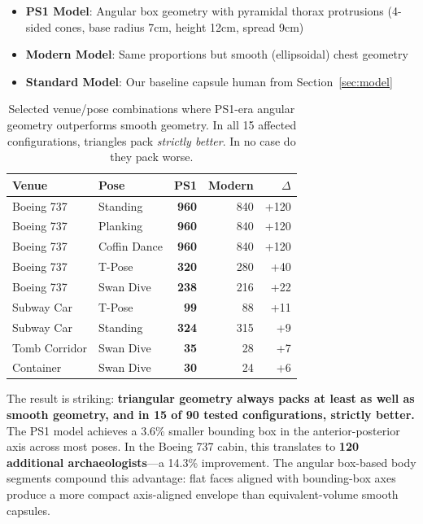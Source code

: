 \documentclass[11pt,letterpaper]{article}
\begin{document}
\begin{itemize}
    \item \textbf{PS1 Model}: Angular box geometry with pyramidal thorax protrusions (4-sided cones, base radius 7cm, height 12cm, spread 9cm)
    \item \textbf{Modern Model}: Same proportions but smooth (ellipsoidal) chest geometry
    \item \textbf{Standard Model}: Our baseline capsule human from Section~\ref{sec:model}
\end{itemize}

\begin{table}[H]
\centering
\small
\begin{tabular}{llrrr}
\toprule
\textbf{Venue} & \textbf{Pose} & \textbf{PS1} & \textbf{Modern} & \textbf{$\Delta$} \\
\midrule
Boeing 737 & Standing & \textbf{960} & 840 & +120 \\
Boeing 737 & Planking & \textbf{960} & 840 & +120 \\
Boeing 737 & Coffin Dance & \textbf{960} & 840 & +120 \\
Boeing 737 & T-Pose & \textbf{320} & 280 & +40 \\
Boeing 737 & Swan Dive & \textbf{238} & 216 & +22 \\
Subway Car & T-Pose & \textbf{99} & 88 & +11 \\
Subway Car & Standing & \textbf{324} & 315 & +9 \\
Tomb Corridor & Swan Dive & \textbf{35} & 28 & +7 \\
Container & Swan Dive & \textbf{30} & 24 & +6 \\
\bottomrule
\end{tabular}
\caption{Selected venue/pose combinations where PS1-era angular geometry outperforms smooth geometry. In all 15 affected configurations, triangles pack \emph{strictly better}. In no case do they pack worse.}
\label{tab:triangles}
\end{table}

The result is striking: \textbf{triangular geometry always packs at least as well as smooth geometry, and in 15 of 90 tested configurations, strictly better.} The PS1 model achieves a 3.6\% smaller bounding box in the anterior-posterior axis across most poses. In the Boeing 737 cabin, this translates to \textbf{120 additional archaeologists}---a 14.3\% improvement. The angular box-based body segments compound this advantage: flat faces aligned with bounding-box axes produce a more compact axis-aligned envelope than equivalent-volume smooth capsules.
\end{document}
